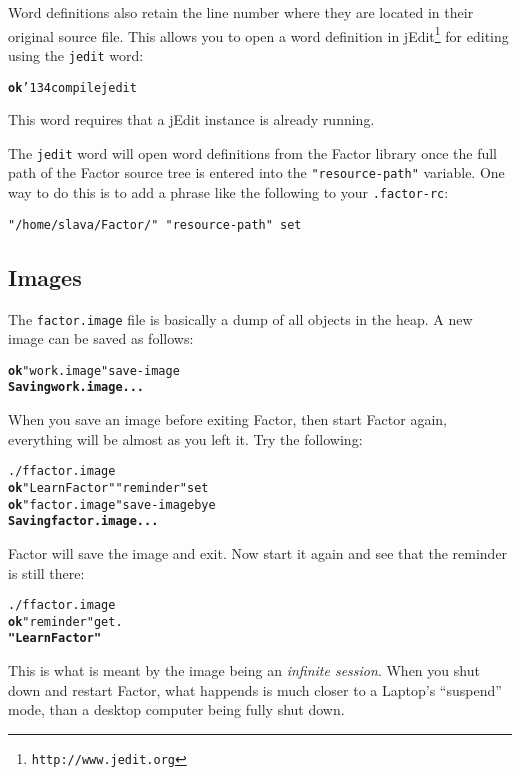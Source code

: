 \documentclass{book}
\newcommand{\bs}{\char'134}
\begin{document}
Word definitions also retain the line number where they are located in their original source file. This allows you to open a word definition in jEdit\footnote{\texttt{http://www.jedit.org}} for editing using the
\texttt{jedit} word:

\begin{alltt}
\textbf{ok} \bs compile jedit
\end{alltt}

This word requires that a jEdit instance is already running.

The \texttt{jedit} word will open word definitions from the Factor library once the full path of the Factor source tree is entered into the \texttt{"resource-path"} variable. One way to do this is to add a phrase like the following to your \texttt{.factor-rc}:

\begin{verbatim}
"/home/slava/Factor/" "resource-path" set
\end{verbatim}

\subsection{Images}

The \texttt{factor.image} file is basically a dump of all objects in the heap. A new image can be saved as follows:

\begin{alltt}
\textbf{ok} "work.image" save-image
\textbf{Saving work.image...}
\end{alltt}

When you save an image before exiting Factor, then start Factor again, everything will be almost as you left it. Try the following:

\begin{alltt}
./f factor.image
\textbf{ok} "Learn Factor" "reminder" set
\textbf{ok} "factor.image" save-image bye
\textbf{Saving factor.image...}
\end{alltt}

Factor will save the image and exit. Now start it again and see that the reminder is still there:

\begin{alltt}
./f factor.image
\textbf{ok} "reminder" get .
\textbf{"Learn Factor"}
\end{alltt}

This is what is meant by the image being an \emph{infinite session}. When you shut down and restart Factor, what happends is much closer to a Laptop's ``suspend'' mode, than a desktop computer being fully shut down.
\end{document}
